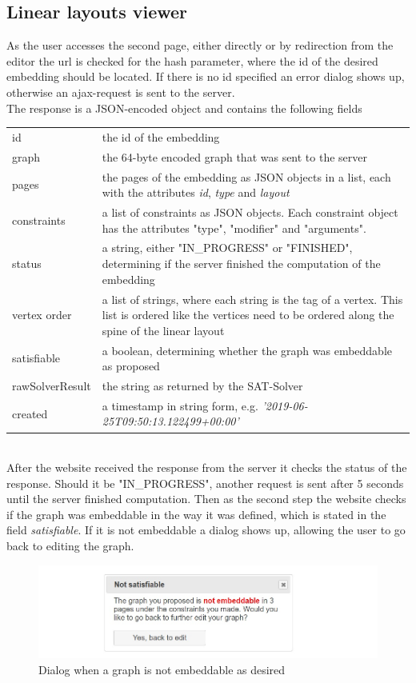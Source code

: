\subsection{Linear layouts viewer}
\label{viewerOV}
As the user accesses the second page, either directly or by redirection from the editor the url is checked for the hash parameter, where the id of the desired embedding should be located. If there is no id specified an error dialog shows up, otherwise an ajax-request is sent to the server.\\
The response is a JSON-encoded object and contains the following fields \cite{linearLayoutApi}\\[12px]
\begin{tabular}{l p{}}
id & the id of the embedding\\
graph & the 64-byte encoded graph that was sent to the server\\
pages & the pages of the embedding as JSON objects in a list, each with the attributes \textit{id}, \textit{type} and \textit{layout}\\
constraints & a list of constraints as JSON objects. Each constraint object has the attributes "type", "modifier" and "arguments".\\
status & a string, either "IN\_PROGRESS" or "FINISHED", determining if the server finished the computation of the embedding\\
vertex order & a list of strings, where each string is the tag of a vertex. This list is ordered like the vertices need to be ordered along the spine of the linear layout\\
satisfiable & a boolean, determining whether the graph was embeddable as proposed\\
rawSolverResult & the string as returned by the SAT-Solver\\
created & a timestamp in string form, e.g. \textit{'2019-06-25T09:50:13.122499+00:00'}
\end{tabular}\\[12pt]
After the website received the response from the server it checks the status of the response. Should it be "IN\_PROGRESS", another request is sent after 5 seconds until the server finished computation. Then as the second step the website checks if the graph was embeddable in the way it was defined, which is stated in the field \textit{satisfiable}. If it is not embeddable a dialog shows up, allowing the user to go back to editing the graph.\\
\begin{figure}
\begin{center}
\includegraphics[width=\textwidth]{figures/figSecond/NotEmbeddable.jpg}
\caption{Dialog when a graph is not embeddable as desired}
\end{center}
\label{notSat}
\end{figure}
